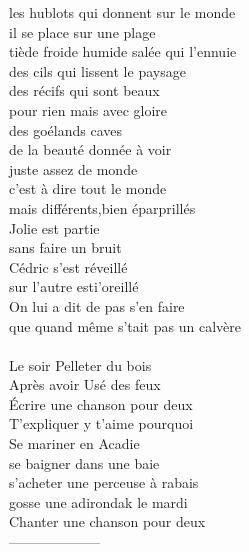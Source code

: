 \documentclass{article}
\begin{document}
les hublots qui donnent sur le monde\\
il se place sur une plage\\
tiède froide humide salée qui l'ennuie\\
des cils qui lissent le paysage\\
des récifs qui sont beaux\\
pour rien mais avec gloire\\
des goélands caves\\
de la beauté donnée à voir\\
juste assez de monde\\
c'est à dire tout le monde\\
mais différents,bien éparprillés\\
\clearpage
Jolie est partie \\
sans faire un bruit\\
Cédric s'est réveillé\\
sur l'autre esti'oreillé\\
On lui a dit de pas s'en faire\\
que quand même s'tait pas un calvère\\
\\
Le soir Pelleter du bois\\
Après avoir Usé des feux\\
Écrire une chanson pour deux\\
T'expliquer y t'aime pourquoi\\
Se mariner en Acadie \\
se baigner dans une baie\\
s'acheter une perceuse à rabais\\
gosse une adirondak le mardi\\
Chanter une chanson pour deux\\
\clearpage
--------------------
\end{document}
